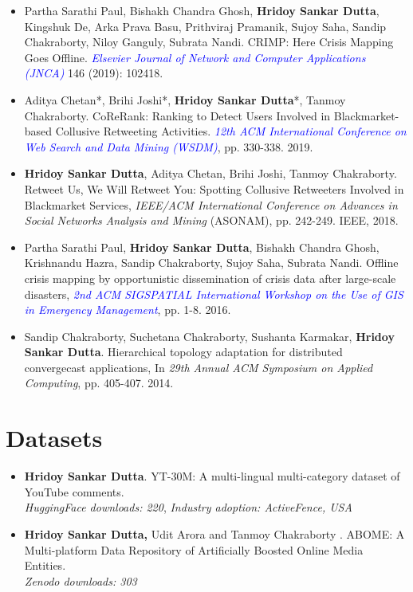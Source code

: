 \documentclass[margin, centered,lmodern]{res}
\begin{document}
\begin{resume}
\begin{itemize}[leftmargin=*]
\item Partha Sarathi Paul, Bishakh Chandra Ghosh, \textbf{Hridoy Sankar Dutta}, Kingshuk De, Arka Prava Basu, Prithviraj Pramanik, Sujoy Saha, Sandip Chakraborty, Niloy Ganguly, Subrata Nandi. CRIMP: Here Crisis Mapping Goes Offline. \textit{\textcolor{blue}{Elsevier Journal of Network and Computer Applications (JNCA)}} 146 (2019): 102418.

\item  Aditya Chetan*, Brihi Joshi*, \textbf{Hridoy Sankar Dutta}*, Tanmoy Chakraborty. CoReRank: Ranking to Detect Users Involved in Blackmarket-based Collusive Retweeting Activities. \textit{\textcolor{blue}{12th ACM International Conference on Web Search and Data Mining (WSDM)}}, pp. 330-338. 2019.


\item \textbf{Hridoy Sankar Dutta}, Aditya Chetan, Brihi Joshi, Tanmoy Chakraborty. Retweet Us, We Will Retweet You: Spotting Collusive Retweeters Involved in Blackmarket Services, \textit{IEEE/ACM International Conference on Advances in Social Networks Analysis and Mining} (ASONAM), pp. 242-249. IEEE, 2018.

\item Partha Sarathi Paul, \textbf{Hridoy Sankar Dutta}, Bishakh Chandra Ghosh, Krishnandu Hazra, Sandip Chakraborty, Sujoy Saha, Subrata Nandi. Offline crisis mapping by opportunistic dissemination of crisis data after large-scale disasters, \textit{\textcolor{blue}{2nd ACM SIGSPATIAL International Workshop on the Use of GIS in Emergency Management}}, pp. 1-8. 2016.

\item Sandip Chakraborty, Suchetana Chakraborty, Sushanta Karmakar, \textbf{Hridoy Sankar Dutta}. Hierarchical topology adaptation for distributed convergecast applications, In \textit{29th Annual ACM Symposium on Applied Computing}, pp. 405-407. 2014.\end{itemize}


\section{Datasets}
\begin{itemize}[leftmargin=*]
\item \textbf{Hridoy Sankar Dutta}. YT-30M: A multi-lingual multi-category dataset of YouTube comments.\\
\textit{\small{HuggingFace downloads: 220}},
\textit{\small{Industry adoption: ActiveFence, USA}}
\item \textbf{Hridoy Sankar Dutta,} Udit Arora and Tanmoy Chakraborty
. ABOME: A Multi-platform Data Repository of Artificially Boosted Online Media Entities.\\
\textit{\small{Zenodo downloads: 303}}
\end{itemize}

\end{resume}
\end{document}
